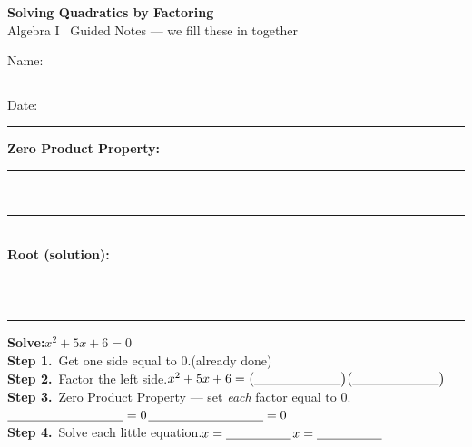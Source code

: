 \documentclass[12pt]{article}
\begin{document}
\begin{center}{\Large\textbf{Solving Quadratics by Factoring}}\\[2pt]{\small Algebra I \textbar\ Guided Notes --- we fill these in together}\end{center}
Name: \rule{5cm}{0.4pt}\hfill Date: \rule{3cm}{0.4pt}
\vspace{0.3cm}

\begin{tcolorbox}[colback=blue!3,colframe=blue!55!black,title=Vocabulary --- write the definition]
\textbf{Zero Product Property:}\\[4pt]
\rule{\linewidth}{0.4pt}\\[12pt]
\rule{\linewidth}{0.4pt}\\[16pt]
\textbf{Root (solution):}\\[4pt]
\rule{\linewidth}{0.4pt}\\[12pt]
\rule{\linewidth}{0.4pt}
\end{tcolorbox}
\vspace{0.2cm}

\begin{tcolorbox}[colback=gray!4,colframe=gray!55!black,title=We do together --- worked example]
\textbf{Solve:}\quad $x^{2}+5x+6=0$\\[12pt]
\textbf{Step 1.}\ Get one side equal to $0$.\hfill(already done)\\[18pt]
\textbf{Step 2.}\ Factor the left side.\qquad $x^{2}+5x+6=\big(\underline{\hspace{2.4cm}}\big)\big(\underline{\hspace{2.4cm}}\big)$\\[26pt]
\textbf{Step 3.}\ Zero Product Property --- set \emph{each} factor equal to $0$.\\[10pt]
\hspace*{2.5em}$\underline{\hspace{3.2cm}}=0$\hspace{2.2cm}$\underline{\hspace{3.2cm}}=0$\\[26pt]
\textbf{Step 4.}\ Solve each little equation.\qquad $x=\underline{\hspace{1.8cm}}$\hspace{1.6cm}$x=\underline{\hspace{1.8cm}}$
\end{tcolorbox}
\vspace{0.2cm}
\end{document}
